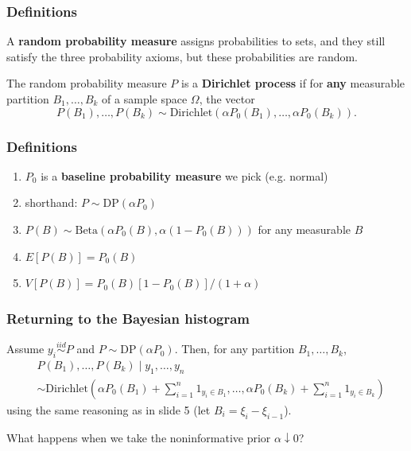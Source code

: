 \documentclass{beamer}
\begin{document}
\begin{frame}
\frametitle{Definitions}

A {\bf random probability measure} assigns probabilities to sets, and they still satisfy the three probability axioms, but these probabilities are random. 
\newline
\pause

The random probability measure $P$ is a {\bf Dirichlet process} if for {\bf any} measurable partition $B_1, \ldots, B_k$ of a sample space $\Omega$, the vector
$$
P(B_1), \ldots, P(B_k) \sim \text{Dirichlet}(\alpha P_0(B_1), \ldots, \alpha P_0(B_k)).
$$


\end{frame}
\begin{frame}
\frametitle{Definitions}


\begin{enumerate}
\item $P_0$ is a {\bf baseline probability measure} we pick (e.g. normal)
\item shorthand: $P \sim \text{DP}(\alpha P_0)$
\item $P(B) \sim \text{Beta}(\alpha P_0(B), \alpha(1-P_0(B)))$ for any measurable $B$
\item $E[P(B)] = P_0(B)$
\item $V[P(B)] = P_0(B)[1-P_0(B)]/(1+\alpha)$
\end{enumerate}

\end{frame}

\begin{frame}
\frametitle{Returning to the Bayesian histogram}

Assume $y_i \overset{iid}{\sim} P$ and $P \sim \text{DP}(\alpha P_0)$. Then, for any partition $B_1, \ldots, B_k$,  
\begin{align*}
&P(B_1), \ldots, P(B_k) \mid y_1, \ldots, y_n \\
&\sim \text{Dirichlet}\left(\alpha P_0(B_1) + \sum_{i=1}^n 1_{y_i \in B_1}, \ldots, \alpha P_0(B_k) + \sum_{i=1}^n 1_{y_i \in B_k} \right)
\end{align*}
using the same reasoning as in slide 5 (let $B_i = \xi_i - \xi_{i-1}$).
\newline
\pause

What happens when we take the noninformative prior $\alpha \downarrow 0$?

\end{frame}
\end{document}
